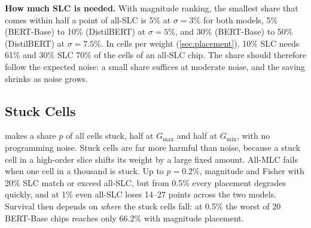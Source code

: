 \begin{table}[t]
\centering\footnotesize
\caption{Paired difference to magnitude, in correctly classified sentences out of 872 (mean $\pm$
standard error over 100 chips per noise level, 300 overall).}\label{tab:paired}
\setlength{\tabcolsep}{2pt}
\end{table}

\textbf{How much SLC is needed.} With magnitude ranking, the smallest share that comes within half a
point of all-SLC is 5\% at $\sigma=3\%$ for both models, 5\% (BERT-Base) to 10\% (DistilBERT) at
$\sigma=5\%$, and 30\% (BERT-Base) to 50\% (DistilBERT) at $\sigma=7.5\%$. In cells per weight
(\cref{sec:placement}), 10\% SLC needs 61\% and 30\% SLC 70\% of the cells of an all-SLC chip. The share
should therefore follow the expected noise: a small share suffices at moderate noise, and the saving
shrinks as noise grows.

\subsection{Stuck Cells}
 makes a share $p$ of all cells stuck, half at $G_{\max}$ and half at $G_{\min}$, with no
programming noise. Stuck cells are far more harmful than noise, because a stuck cell in a high-order slice
shifts its weight by a large fixed amount. All-MLC fails when one cell in a thousand is stuck. Up to
$p=0.2\%$, magnitude and Fisher with 20\% SLC match or exceed all-SLC, but from 0.5\% every placement
degrades quickly, and at 1\% even all-SLC loses 14--27 points across the two models. Survival then depends
on \emph{where} the stuck cells fall: at 0.5\% the worst of 20 BERT-Base chips reaches only 66.2\% with
magnitude placement. 

